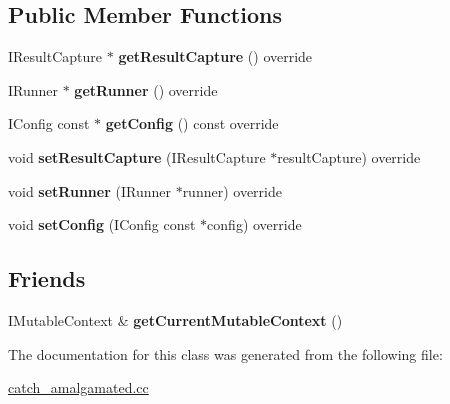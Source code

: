 \subsection*{Public Member Functions}
\begin{DoxyCompactItemize}
\item 
\mbox{\label{classCatch_1_1Context_aead6db73ac48bfc8043946de905de2fc}} 
I\+Result\+Capture $\ast$ {\bfseries get\+Result\+Capture} () override
\item 
\mbox{\label{classCatch_1_1Context_a308cedbf37adc981d78ea8c3fd4d2793}} 
I\+Runner $\ast$ {\bfseries get\+Runner} () override
\item 
\mbox{\label{classCatch_1_1Context_a9a7650605bcb44da52769c4760a83a74}} 
I\+Config const  $\ast$ {\bfseries get\+Config} () const override
\item 
\mbox{\label{classCatch_1_1Context_a3845fb318b9d6ee96961d9013ee8c0ef}} 
void {\bfseries set\+Result\+Capture} (I\+Result\+Capture $\ast$result\+Capture) override
\item 
\mbox{\label{classCatch_1_1Context_ab689f97687dd626f89e8a208c4903f97}} 
void {\bfseries set\+Runner} (I\+Runner $\ast$runner) override
\item 
\mbox{\label{classCatch_1_1Context_a0fcec7be2d1f1a7591b6ee559d03afc9}} 
void {\bfseries set\+Config} (I\+Config const $\ast$config) override
\end{DoxyCompactItemize}
\subsection*{Friends}
\begin{DoxyCompactItemize}
\item 
\mbox{\label{classCatch_1_1Context_aea4b25692aaf4397cdf630716976f6b8}} 
I\+Mutable\+Context \& {\bfseries get\+Current\+Mutable\+Context} ()
\end{DoxyCompactItemize}


The documentation for this class was generated from the following file\+:\begin{DoxyCompactItemize}
\item 
\hyperlink{catch__amalgamated_8cc}{catch\+\_\+amalgamated.\+cc}\end{DoxyCompactItemize}
